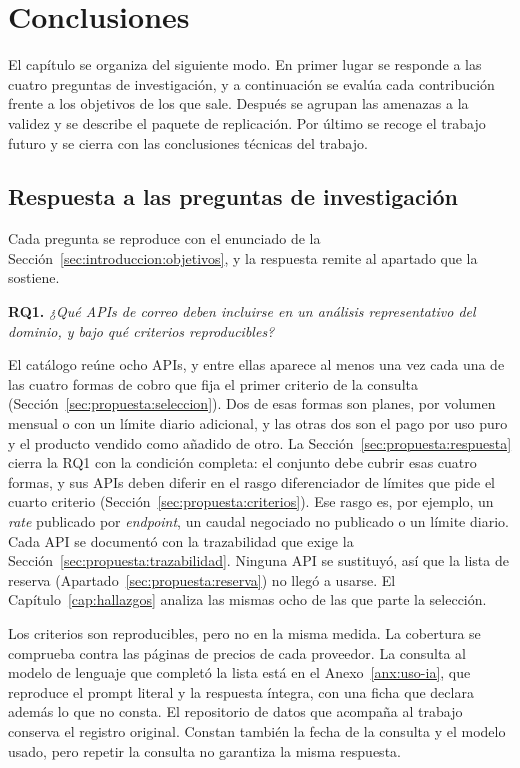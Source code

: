 \chapter{Conclusiones}\label{cap:conclusiones}

El capítulo se organiza del siguiente modo.
En primer lugar se responde a las cuatro preguntas de investigación, y a continuación se evalúa cada contribución frente a los objetivos de los que sale.
Después se agrupan las amenazas a la validez y se describe el paquete de replicación.
Por último se recoge el trabajo futuro y se cierra con las conclusiones técnicas del trabajo.

\section{Respuesta a las preguntas de investigación}\label{sec:conclusiones:rq}

Cada pregunta se reproduce con el enunciado de la Sección~\ref{sec:introduccion:objetivos}, y la respuesta remite al apartado que la sostiene.

\noindent\textbf{RQ1.} \emph{¿Qué APIs de correo deben incluirse en un análisis representativo del dominio, y bajo qué criterios reproducibles?}

El catálogo reúne ocho APIs, y entre ellas aparece al menos una vez cada una de las cuatro formas de cobro que fija el primer criterio de la consulta (Sección~\ref{sec:propuesta:seleccion}).
Dos de esas formas son planes, por volumen mensual o con un límite diario adicional, y las otras dos son el pago por uso puro y el producto vendido como añadido de otro.
La Sección~\ref{sec:propuesta:respuesta} cierra la RQ1 con la condición completa: el conjunto debe cubrir esas cuatro formas, y sus APIs deben diferir en el rasgo diferenciador de límites que pide el cuarto criterio (Sección~\ref{sec:propuesta:criterios}).
Ese rasgo es, por ejemplo, un \textit{rate} publicado por \textit{endpoint}, un caudal negociado no publicado o un límite diario.
Cada API se documentó con la trazabilidad que exige la Sección~\ref{sec:propuesta:trazabilidad}.
Ninguna API se sustituyó, así que la lista de reserva (Apartado~\ref{sec:propuesta:reserva}) no llegó a usarse.
El Capítulo~\ref{cap:hallazgos} analiza las mismas ocho de las que parte la selección.

Los criterios son reproducibles, pero no en la misma medida.
La cobertura se comprueba contra las páginas de precios de cada proveedor.
La consulta al modelo de lenguaje que completó la lista está en el Anexo~\ref{anx:uso-ia}, que reproduce el prompt literal y la respuesta íntegra, con una ficha que declara además lo que no consta.
El repositorio de datos que acompaña al trabajo conserva el registro original.
Constan también la fecha de la consulta y el modelo usado, pero repetir la consulta no garantiza la misma respuesta.

